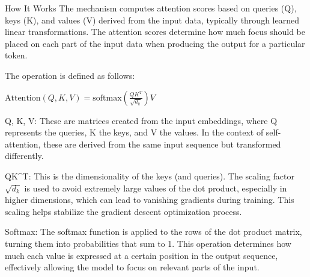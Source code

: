 \documentclass[11pt]{article}
\begin{document}
How It Works The mechanism computes attention scores based on queries
(Q), keys (K), and values (V) derived from the input data, typically
through learned linear transformations. The attention scores determine
how much focus should be placed on each part of the input data when
producing the output for a particular token.

The operation is defined as follows:

\(\text{Attention}(Q,K,V) = \text{softmax}\left( \frac{QK^T}{\sqrt{d_k}} \right)V\)

Q, K, V: These are matrices created from the input embeddings, where Q
represents the queries, K the keys, and V the values. In the context of
self-attention, these are derived from the same input sequence but
transformed differently.

QK\^{}T: This is the dimensionality of the keys (and queries). The
scaling factor \(\sqrt{d_k}\) is used to avoid extremely large values of
the dot product, especially in higher dimensions, which can lead to
vanishing gradients during training. This scaling helps stabilize the
gradient descent optimization process.

Softmax: The softmax function is applied to the rows of the dot product
matrix, turning them into probabilities that sum to 1. This operation
determines how much each value is expressed at a certain position in the
output sequence, effectively allowing the model to focus on relevant
parts of the input.
\end{document}
